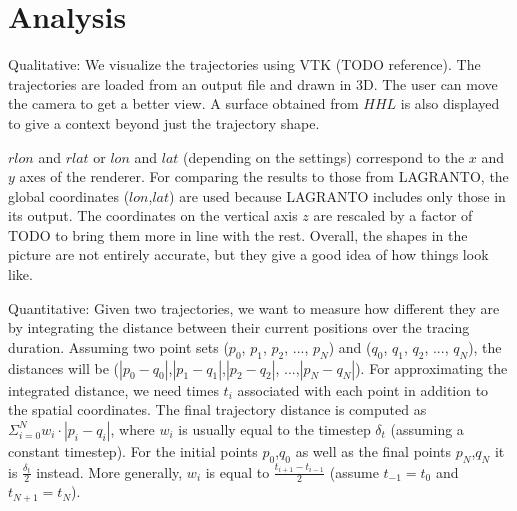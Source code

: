 \section{Analysis}

Qualitative:
We visualize the trajectories using VTK (TODO reference). The trajectories are loaded from an output file and drawn in 3D. The user can move the camera to get a better view. A surface obtained from $HHL$ is also displayed to give a context beyond just the trajectory shape.

$rlon$ and $rlat$ or $lon$ and $lat$ (depending on the settings) correspond to the $x$ and $y$ axes of the renderer. For comparing the results to those from LAGRANTO, the global coordinates ($lon$,$lat$) are used because LAGRANTO includes only those in its output. The coordinates on the vertical axis $z$ are rescaled by a factor of TODO to bring them more in line with the rest. Overall, the shapes in the picture are not entirely accurate, but they give a good idea of how things look like.

Quantitative:
Given two trajectories, we want to measure how different they are by integrating the distance between their current positions over the tracing duration. Assuming two point sets ($p_0$, $p_1$, $p_2$, ..., $p_N$) and ($q_0$, $q_1$, $q_2$, ..., $q_N$), the distances will be ($|p_0-q_0|$,$|p_1-q_1|$,$|p_2-q_2|$, ...,$|p_N-q_N|$). For approximating the integrated distance, we need times $t_i$ associated with each point in addition to the spatial coordinates. The final trajectory distance is computed as $\Sigma^N_{i=0} w_i \cdot |p_i-q_i|$, where $w_i$ is usually equal to the timestep $\delta_t$ (assuming a constant timestep). For the initial points $p_0$,$q_0$ as well as the final points $p_N$,$q_N$ it is $\frac{\delta_t}{2}$ instead. More generally, $w_i$ is equal to $\frac{t_{i+1}-t_{i-1}}{2}$ (assume $t_{-1} = t_0$ and $t_{N+1} = t_N$).



